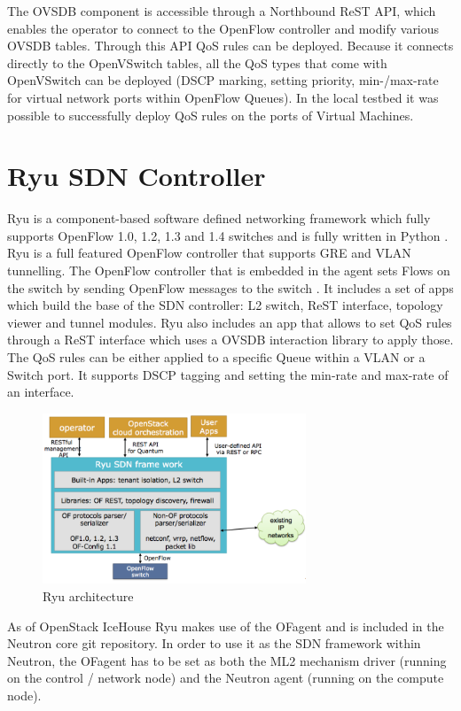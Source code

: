 The OVSDB component is accessible through a Northbound ReST API, which enables the operator to connect to the OpenFlow controller and modify various OVSDB tables. Through this API QoS rules can be deployed. Because it connects directly to the OpenVSwitch tables, all the QoS types that come with OpenVSwitch can be deployed (DSCP marking, setting priority, min-/max-rate for virtual network ports within OpenFlow Queues). In the local testbed it was possible to successfully deploy QoS rules on the ports of Virtual Machines. 


\section{Ryu SDN Controller}

Ryu is a component-based software defined networking framework which fully supports OpenFlow 1.0, 1.2, 1.3 and 1.4 switches and is fully written in Python \cite{ryu-start}. Ryu is a full featured OpenFlow controller that supports GRE and VLAN tunnelling. The OpenFlow controller that is embedded in the agent sets Flows on the switch by sending OpenFlow messages to the switch \cite{ryu-comparison}. It includes a set of apps which build the base of the SDN controller: L2 switch, ReST interface, topology viewer and tunnel modules. Ryu also includes an app that allows to set QoS rules through a ReST interface which uses a OVSDB interaction library to apply those. The QoS rules can be either applied to a specific Queue within a VLAN or a Switch port. It supports DSCP tagging and setting the min-rate and max-rate of an interface.

\begin{figure}[H]
\centering
\includegraphics[width=0.7\textwidth]{images/sota/ryu_architecture.png}
\caption{Ryu architecture}
\end{figure}


As of OpenStack IceHouse Ryu makes use of the OFagent and is included in the Neutron core git repository. In order to use it as the SDN framework within Neutron, the OFagent  has to be set as both the ML2 mechanism driver (running on the control / network node) and the Neutron agent (running on the compute node). 



